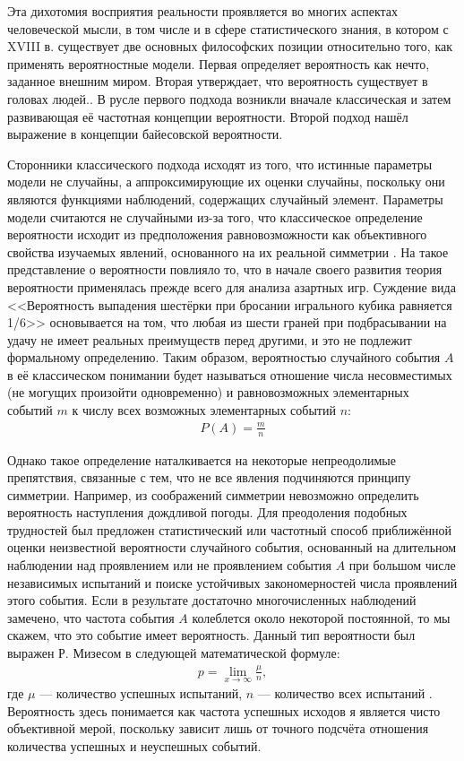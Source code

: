 Эта дихотомия восприятия реальности проявляется во многих аспектах человеческой мысли, в том числе и в сфере статистического знания, в котором с XVIII в. существует две основных философских позиции относительно того, как применять вероятностные модели. Первая определяет вероятность как нечто, заданное внешним миром. Вторая утверждает, что вероятность существует в головах людей.\cite[стр. 18]{Christensen2010}. В русле первого подхода возникли вначале классическая и затем развивающая её частотная концепции вероятности. Второй подход нашёл выражение в концепции байесовской вероятности.

Сторонники классического подхода исходят из того, что истинные параметры модели не случайны, а аппроксимирующие их оценки случайны, поскольку они являются функциями наблюдений, содержащих случайный элемент. \cite[стр. 5-6]{Zellner1980} Параметры модели считаются не случайными из-за того, что классическое определение вероятности исходит из предположения равновозможности как объективного свойства изучаемых явлений, основанного на их реальной симметрии \cite[стр. 24]{Gnedenko2005}. На такое представление о вероятности повлияло то, что в начале своего развития теория вероятности применялась прежде всего для анализа азартных игр. Суждение вида <<Вероятность выпадения шестёрки при бросании игрального кубика равняется 1/6>> основывается на том, что любая из шести граней при подбрасывании на удачу не имеет реальных преимуществ перед другими, и это не подлежит формальному определению. Таким образом, вероятностью случайного события $A$ в её классическом понимании будет называться отношение числа несовместимых (не могущих произойти одновременно) и равновозможных элементарных событий $m$ к числу всех возможных элементарных событий $n$:
\begin{eqnarray}
P(A)=\frac{m}{n}
\end{eqnarray}

Однако такое определение наталкивается на некоторые непреодолимые препятствия, связанные с тем, что не все явления подчиняются принципу симметрии. Например, из соображений симметрии невозможно определить вероятность наступления дождливой погоды. Для преодоления подобных трудностей был предложен статистический или частотный способ приближённой оценки неизвестной вероятности случайного события, основанный на длительном наблюдении над проявлением или не проявлением события $A$ при большом числе независимых испытаний и поиске устойчивых закономерностей числа проявлений этого события. Если в результате достаточно многочисленных наблюдений замечено, что частота события $A$ колеблется около некоторой постоянной, то мы скажем, что это событие имеет вероятность. Данный тип вероятности был выражен Р. Мизесом в следующей математической формуле:
\begin{eqnarray}
p=\lim_{x\to\infty}\frac{\mu}{n},
\end{eqnarray}
где $\mu$ --- количество успешных испытаний, $n$ --- количество всех испытаний \cite[стр. 46-47]{Gnedenko2005}. Вероятность здесь понимается как частота успешных исходов я является чисто объективной мерой, поскольку зависит лишь от точного подсчёта отношения количества успешных и неуспешных событий. 

